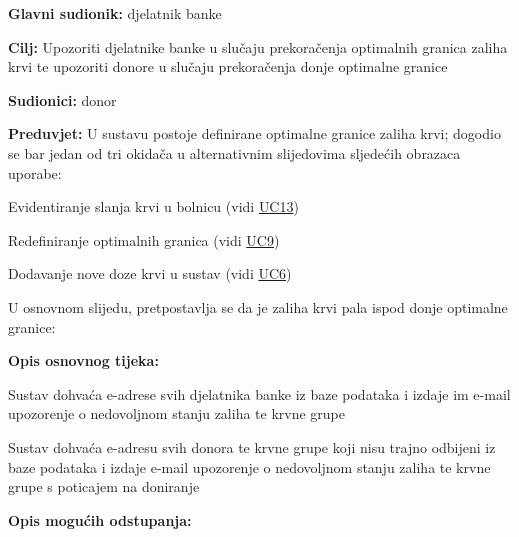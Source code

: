 					
					\noindent {}
					\begin{packed_item} \label{UC14}
	
						\item \textbf{Glavni sudionik: }djelatnik banke
						\item  \textbf{Cilj:} Upozoriti djelatnike banke u slučaju prekoračenja optimalnih granica zaliha krvi te upozoriti donore u slučaju prekoračenja donje optimalne granice
						\item  \textbf{Sudionici:} donor
						\item  \textbf{Preduvjet:} U sustavu postoje definirane optimalne granice zaliha krvi; dogodio se bar jedan od tri okidača u alternativnim slijedovima sljedećih obrazaca uporabe:
						\begin{packed_enum}
						    \item Evidentiranje slanja krvi u bolnicu (vidi \hyperref[UC13]{UC13})
						     \item Redefiniranje optimalnih granica (vidi \hyperref[UC9]{UC9})
						     \item Dodavanje nove doze krvi u sustav (vidi \hyperref[UC6]{UC6})
						\end{packed_enum}
						U osnovnom slijedu, pretpostavlja se da je zaliha krvi pala ispod donje optimalne granice:
						\item  \textbf{Opis osnovnog tijeka:}
						\item[] \begin{packed_enum}

	                        \item Sustav dohvaća e-adrese svih djelatnika banke iz baze podataka i izdaje im e-mail upozorenje o nedovoljnom stanju zaliha te krvne grupe 
	                        \item Sustav dohvaća e-adresu svih donora te krvne grupe koji nisu trajno odbijeni iz baze podataka i izdaje e-mail upozorenje o nedovoljnom stanju zaliha te krvne grupe s poticajem na doniranje 
	                       
    						
						\end{packed_enum}
						
						\item  \textbf{Opis mogućih odstupanja:}
						
						\item[] \begin{packed_item}
						

\end{packed_item}
\end{packed_item}
